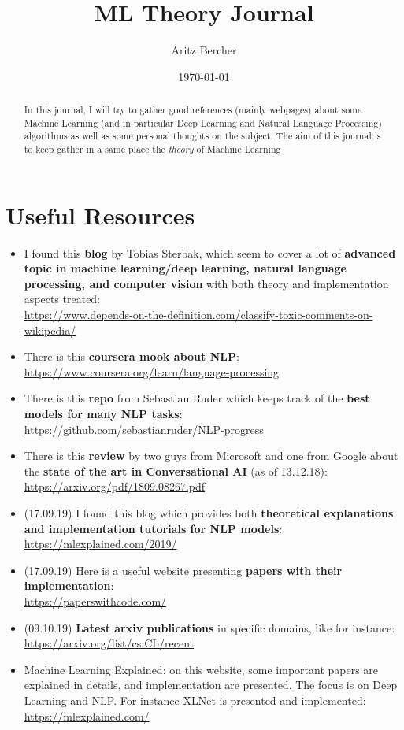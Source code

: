 \documentclass[11pt,a4paper]{article}
\title{ML Theory Journal}
\author{Aritz Bercher}
\date{\today}
\begin{document}
\maketitle

\begin{abstract}
In this journal, I will try to gather good references (mainly webpages) about some Machine Learning (and in particular Deep Learning and Natural Language Processing) algorithms as well as some personal thoughts on the subject. The aim of this journal is to keep gather in a same place the \textit{theory} of Machine Learning
\end{abstract}

\tableofcontents

\section{Useful Resources}
\begin{itemize}
\item I found this \textbf{blog} by Tobias Sterbak, which seem to cover a lot of \textbf{advanced topic in machine learning/deep learning, natural language processing, and computer vision} with both theory and implementation aspects treated:\\
\url{https://www.depends-on-the-definition.com/classify-toxic-comments-on-wikipedia/}
\item There is this \textbf{coursera mook about NLP}:\\
\url{https://www.coursera.org/learn/language-processing}
\item There is this \textbf{repo} from Sebastian Ruder which keeps track of the \textbf{best models for many NLP tasks}:\\
\url{https://github.com/sebastianruder/NLP-progress}
\item There is this \textbf{review} by two guys from Microsoft and one from Google about the \textbf{state of the art in Conversational AI} (as of 13.12.18):\\
\url{https://arxiv.org/pdf/1809.08267.pdf}
\item (17.09.19) I found this blog which provides both \textbf{theoretical explanations and implementation tutorials for NLP models}:\\
\url{https://mlexplained.com/2019/}
\item (17.09.19) Here is a useful website presenting \textbf{papers with their implementation}:\\
\url{https://paperswithcode.com/}
\item (09.10.19) \textbf{Latest arxiv publications} in specific domains, like for instance:\\
\url{https://arxiv.org/list/cs.CL/recent}
\item Machine Learning Explained: on this website, some important papers are explained in details, and implementation are presented. The focus is on Deep Learning and NLP. For instance XLNet is presented and implemented:\\
\url{https://mlexplained.com/}
\end{itemize}
\end{document}
